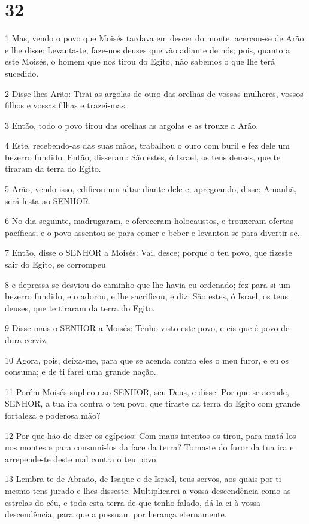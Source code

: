 \chapter{32}

\par 1 Mas, vendo o povo que Moisés tardava em descer do monte, acercou-se de Arão e lhe disse: Levanta-te, faze-nos deuses que vão adiante de nós; pois, quanto a este Moisés, o homem que nos tirou do Egito, não sabemos o que lhe terá sucedido.
\par 2 Disse-lhes Arão: Tirai as argolas de ouro das orelhas de vossas mulheres, vossos filhos e vossas filhas e trazei-mas.
\par 3 Então, todo o povo tirou das orelhas as argolas e as trouxe a Arão.
\par 4 Este, recebendo-as das suas mãos, trabalhou o ouro com buril e fez dele um bezerro fundido. Então, disseram: São estes, ó Israel, os teus deuses, que te tiraram da terra do Egito.
\par 5 Arão, vendo isso, edificou um altar diante dele e, apregoando, disse: Amanhã, será festa ao SENHOR.
\par 6 No dia seguinte, madrugaram, e ofereceram holocaustos, e trouxeram ofertas pacíficas; e o povo assentou-se para comer e beber e levantou-se para divertir-se.
\par 7 Então, disse o SENHOR a Moisés: Vai, desce; porque o teu povo, que fizeste sair do Egito, se corrompeu
\par 8 e depressa se desviou do caminho que lhe havia eu ordenado; fez para si um bezerro fundido, e o adorou, e lhe sacrificou, e diz: São estes, ó Israel, os teus deuses, que te tiraram da terra do Egito.
\par 9 Disse mais o SENHOR a Moisés: Tenho visto este povo, e eis que é povo de dura cerviz.
\par 10 Agora, pois, deixa-me, para que se acenda contra eles o meu furor, e eu os consuma; e de ti farei uma grande nação.
\par 11 Porém Moisés suplicou ao SENHOR, seu Deus, e disse: Por que se acende, SENHOR, a tua ira contra o teu povo, que tiraste da terra do Egito com grande fortaleza e poderosa mão?
\par 12 Por que hão de dizer os egípcios: Com maus intentos os tirou, para matá-los nos montes e para consumi-los da face da terra? Torna-te do furor da tua ira e arrepende-te deste mal contra o teu povo.
\par 13 Lembra-te de Abraão, de Isaque e de Israel, teus servos, aos quais por ti mesmo tens jurado e lhes disseste: Multiplicarei a vossa descendência como as estrelas do céu, e toda esta terra de que tenho falado, dá-la-ei à vossa descendência, para que a possuam por herança eternamente.
